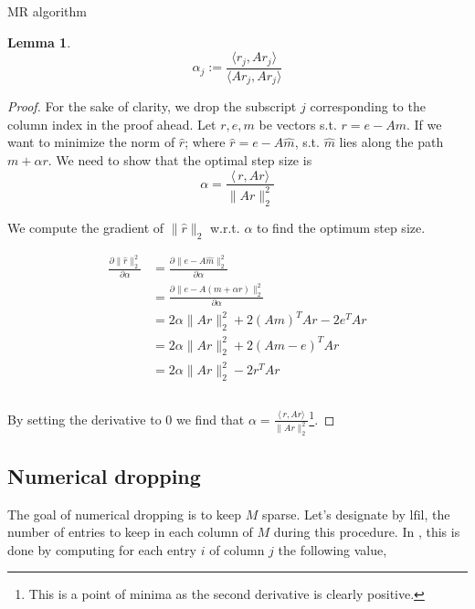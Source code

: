 \documentclass[paper=A4, fontsize=11pt]{scrartcl}
\newtheorem{lemma}{Lemma}[section]
\theoremstyle{remark}
\begin{document}
\begin{section}{MR algorithm}
\begin{lemma}
	\begin{equation}
	\alpha_{j} :=\frac{\langle r_{j}, A r_{j}\rangle}{\langle A r_{j}, A r_{j}\rangle}
	\end{equation}
	
\end{lemma}

\begin{proof}
		For the sake of clarity, we drop the subscript $j$ corresponding to the column index in the proof ahead. 
		Let $r, e, m$ be vectors s.t. $r = e - Am$. If we want to minimize the norm of $\hat{r}$; where $\hat{r} = e - A\hat{m}$, s.t. $\hat{m}$ lies along the path $m + \alpha r$. We need to show that the optimal step size is $$\alpha = \frac{\langle\,r,Ar\rangle}{\|Ar\|_{2}^{2}}$$
	
		We compute the gradient of $\|\hat{r}\|_{2}$ w.r.t. $\alpha$ to find the optimum step size. 
	
	\begin{equation}
	\begin{aligned}
	\frac{\partial \|\hat{r} \|_{2}^{2}}{\partial \alpha} 
	& = \frac{\partial \|e - A\hat{m}\|_{2}^{2}}{\partial \alpha} \\
	& = \frac{\partial \|e - A(m + \alpha r)\|_{2}^{2}}{\partial \alpha} \\
	& = 2\alpha \|Ar\|_{2}^{2}  + 2(Am)^{T}Ar - 2e^{T}Ar \\
	& = 2\alpha \|Ar\|_{2}^{2}  + 2(Am - e)^{T}Ar \\
	& = 2\alpha \|Ar\|_{2}^{2}  - 2r^{T}Ar \\
	\\
	\end{aligned}
	\end{equation}
	
	By setting the derivative to $0$ we find that $\alpha = \frac{\langle\,r,Ar\rangle}{\|Ar\|_{2}^{2}}$\footnote{This is a point of minima as the second derivative is clearly positive.}.
\end{proof}	

	
	
	\subsection{Numerical dropping}
	The goal of numerical dropping is to keep $M$ sparse. Let's designate by $\text{lfil}$, the number of entries to keep in each column of $M$ during this procedure. In \cite{chow}, this is done by computing for each entry $i$ of column $j$ the following value, 
	


\end{section}
\end{document}
